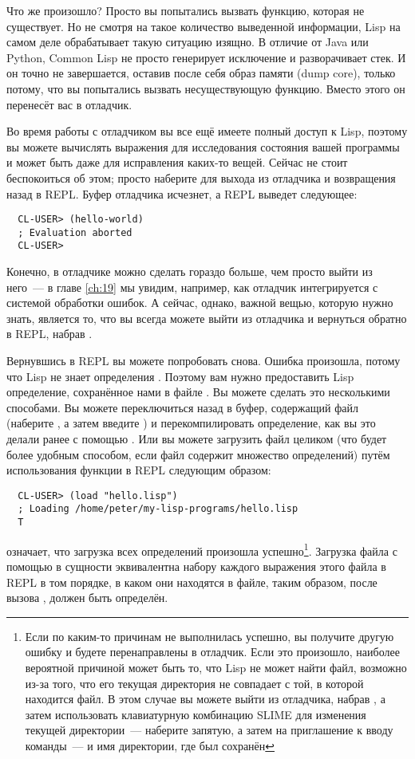 Что же произошло? Просто вы попытались вызвать функцию, которая не существует. Но не
смотря на такое количество выведенной информации, Lisp на самом деле обрабатывает такую
ситуацию изящно. В отличие от Java или Python, Common Lisp не просто генерирует исключение
и разворачивает стек. И он точно не завершается, оставив после себя образ памяти (dump
core), только потому, что вы попытались вызвать несуществующую функцию. Вместо этого он
перенесёт вас в отладчик.

Во время работы с отладчиком вы все ещё имеете полный доступ к Lisp, поэтому вы можете
вычислять выражения для исследования состояния вашей программы и может быть даже для
исправления каких-то вещей. Сейчас не стоит беспокоиться об этом; просто наберите  для
выхода из отладчика и возвращения назад в REPL. Буфер отладчика исчезнет, а REPL выведет
следующее:

\begin{verbatim}
  CL-USER> (hello-world) 
  ; Evaluation aborted
  CL-USER>
\end{verbatim}

Конечно, в отладчике можно сделать гораздо больше, чем просто выйти из него~--- в главе
\ref{ch:19} мы увидим, например, как отладчик интегрируется с системой обработки ошибок.
А сейчас, однако, важной вещью, которую нужно знать, является то, что вы всегда можете
выйти из отладчика и вернуться обратно в REPL, набрав .

Вернувшись в REPL вы можете попробовать снова. Ошибка произошла, потому что Lisp не знает
определения . Поэтому вам нужно предоставить Lisp определение, сохранённое нами
в файле . Вы можете сделать это несколькими способами. Вы можете переключиться
назад в буфер, содержащий файл (наберите , а затем введите ) и
перекомпилировать определение, как вы это делали ранее с помощью . Или вы можете
загрузить файл целиком (что будет более удобным способом, если файл содержит множество
определений) путём использования функции  в REPL следующим образом:

\begin{verbatim}
  CL-USER> (load "hello.lisp")
  ; Loading /home/peter/my-lisp-programs/hello.lisp
  T
\end{verbatim}

 означает, что загрузка всех определений произошла успешно\footnote{Если по каким-то
  причинам  не выполнилась успешно, вы получите другую ошибку и будете перенаправлены
  в отладчик. Если это произошло, наиболее вероятной причиной может быть то, что Lisp не
  может найти файл, возможно из-за того, что его текущая директория не совпадает с той, в
  которой находится файл. В этом случае вы можете выйти из отладчика, набрав , а затем
  использовать клавиатурную комбинацию SLIME  для изменения текущей директории~---
  наберите запятую, а затем на приглашение к вводу команды~---  и имя директории, где был
  сохранён }. Загрузка файла с помощью  в сущности эквивалентна набору
каждого выражения этого файла в REPL в том порядке, в каком они находятся в файле, таким
образом, после вызова ,  должен быть определён.

